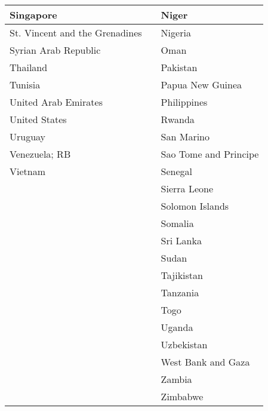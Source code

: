 \documentclass[a4paper]{article}
\begin{document}
\begin{tabular}{|l|l|l|}
\hline
Singapore&&Niger\\
\hline
St. Vincent and the Grenadines&&Nigeria\\
\hline
Syrian Arab Republic&&Oman\\
\hline
Thailand&&Pakistan\\
\hline
Tunisia&&Papua New Guinea\\
\hline
United Arab Emirates&&Philippines\\
\hline
United States&&Rwanda\\
\hline
Uruguay&&San Marino\\
\hline
Venezuela; RB&&Sao Tome and Principe\\
\hline
Vietnam&&Senegal\\
\hline
&&Sierra Leone\\
\hline
&&Solomon Islands\\
\hline
&&Somalia\\
\hline
&&Sri Lanka\\
\hline
&&Sudan\\
\hline
&&Tajikistan\\
\hline
&&Tanzania\\
\hline
&&Togo\\
\hline
&&Uganda\\
\hline
&&Uzbekistan\\
\hline
&&West Bank and Gaza\\
\hline
&&Zambia\\
\hline
&&Zimbabwe\\
\hline
\end{tabular}
\end{document}
